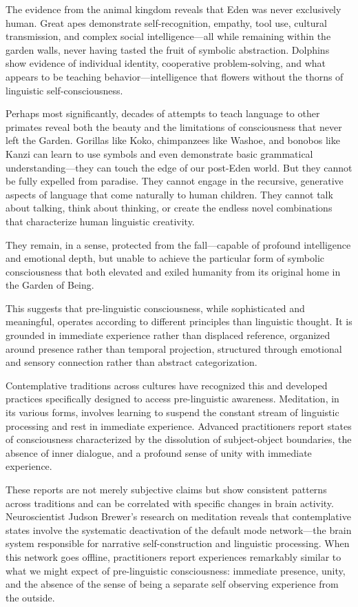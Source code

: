 The evidence from the animal kingdom reveals that Eden was never exclusively human. Great apes demonstrate self-recognition, empathy, tool use, cultural transmission, and complex social intelligence—all while remaining within the garden walls, never having tasted the fruit of symbolic abstraction. Dolphins show evidence of individual identity, cooperative problem-solving, and what appears to be teaching behavior—intelligence that flowers without the thorns of linguistic self-consciousness.

Perhaps most significantly, decades of attempts to teach language to other primates reveal both the beauty and the limitations of consciousness that never left the Garden. Gorillas like Koko, chimpanzees like Washoe, and bonobos like Kanzi can learn to use symbols and even demonstrate basic grammatical understanding—they can touch the edge of our post-Eden world. But they cannot be fully expelled from paradise. They cannot engage in the recursive, generative aspects of language that come naturally to human children. They cannot talk about talking, think about thinking, or create the endless novel combinations that characterize human linguistic creativity.

They remain, in a sense, protected from the fall—capable of profound intelligence and emotional depth, but unable to achieve the particular form of symbolic consciousness that both elevated and exiled humanity from its original home in the Garden of Being.

This suggests that pre-linguistic consciousness, while sophisticated and meaningful, operates according to different principles than linguistic thought. It is grounded in immediate experience rather than displaced reference, organized around presence rather than temporal projection, structured through emotional and sensory connection rather than abstract categorization.

Contemplative traditions across cultures have recognized this and developed practices specifically designed to access pre-linguistic awareness. Meditation, in its various forms, involves learning to suspend the constant stream of linguistic processing and rest in immediate experience. Advanced practitioners report states of consciousness characterized by the dissolution of subject-object boundaries, the absence of inner dialogue, and a profound sense of unity with immediate experience.

These reports are not merely subjective claims but show consistent patterns across traditions and can be correlated with specific changes in brain activity. Neuroscientist Judson Brewer's research on meditation reveals that contemplative states involve the systematic deactivation of the default mode network—the brain system responsible for narrative self-construction and linguistic processing. When this network goes offline, practitioners report experiences remarkably similar to what we might expect of pre-linguistic consciousness: immediate presence, unity, and the absence of the sense of being a separate self observing experience from the outside.

